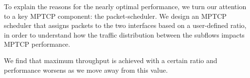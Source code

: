 To explain the reasons for the nearly optimal performance, we turn our
attention to a key MPTCP component: the packet-scheduler. We design an
MPTCP scheduler that assigns packets to the two interfaces based on a
user-defined ratio, in order to understand how the traffic
distribution between the subflows impacts MPTCP performance.
\begin{comment}
\begin{figure}[t]
    \centering
    \subfigure[Throughput vs. packet ratio.] {
        \texttt{[image: contention/ratio\_tput\_bar.pdf]}
        \label{fig:ratio_tput}
    }\hfill
    \subfigure[Delay (\emph{ofo-queue}): $Pkts_{ad}$.] {
        \texttt{[image: contention/ratio\_ofo\_delay.pdf]}
        \label{fig:ratio_tput_ofo_delay}
    }%
    \vspace{-0.2in}
    \caption{Impact of packet scheduling decisions.}
    \vspace{-0.25in}
\end{figure}
Fig.~\ref{fig:ratio_tput} plots the MPTCP throughput against the
number of packets assigned to the 802.11ad subflow ($Pkts_{ad}$) out
of every 100 packets.
\end{comment} 
We find that maximum throughput
is achieved with 
a certain ratio and performance worsens as we
move away from this value.

